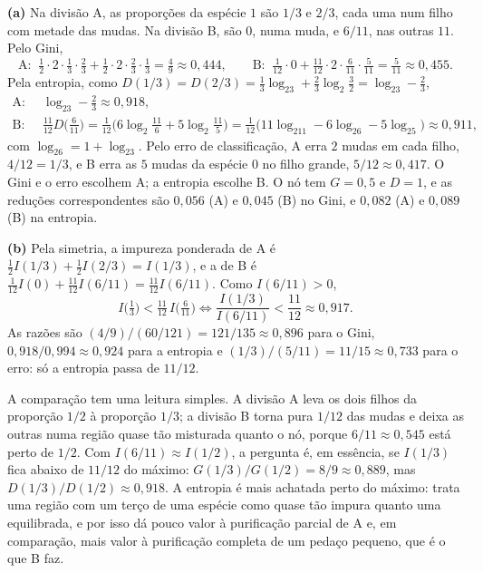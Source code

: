 \begin{solucao}
\textbf{(a)} Na divisão A, as proporções da espécie $1$ são $1/3$ e $2/3$, cada uma num filho
com metade das mudas. Na divisão B, são $0$, numa muda, e $6/11$, nas outras $11$. Pelo Gini,
\[
  \text{A: }\ \tfrac12\cdot2\cdot\tfrac13\cdot\tfrac23+\tfrac12\cdot2\cdot\tfrac23\cdot\tfrac13=\tfrac49\approx0{,}444,
  \qquad
  \text{B: }\ \tfrac1{12}\cdot0+\tfrac{11}{12}\cdot2\cdot\tfrac6{11}\cdot\tfrac5{11}=\tfrac5{11}\approx0{,}455 .
\]
Pela entropia, como $D(1/3)=D(2/3)=\tfrac13\log_23+\tfrac23\log_2\tfrac32=\log_23-\tfrac23$,
\begin{align*}
  \text{A: }\ &\log_23-\tfrac23\approx0{,}918,\\
  \text{B: }\ &\tfrac{11}{12}D\big(\tfrac6{11}\big)
  =\tfrac1{12}\Big(6\log_2\tfrac{11}6+5\log_2\tfrac{11}5\Big)
  =\tfrac1{12}\big(11\log_211-6\log_26-5\log_25\big)\approx0{,}911 ,
\end{align*}
com $\log_26=1+\log_23$. Pelo erro de classificação, A erra $2$ mudas em cada filho, $4/12=1/3$,
e B erra as $5$ mudas da espécie $0$ no filho grande, $5/12\approx0{,}417$. O Gini e o erro
escolhem A; a entropia escolhe B. O nó tem $G=0{,}5$ e $D=1$, e as reduções correspondentes são
$0{,}056$ (A) e $0{,}045$ (B) no Gini, e $0{,}082$ (A) e $0{,}089$ (B) na entropia.

\smallskip
\textbf{(b)} Pela simetria, a impureza ponderada de A é
$\tfrac12I(1/3)+\tfrac12I(2/3)=I(1/3)$, e a de B é
$\tfrac1{12}I(0)+\tfrac{11}{12}I(6/11)=\tfrac{11}{12}I(6/11)$. Como $I(6/11)>0$,
\[
  I\big(\tfrac13\big)<\tfrac{11}{12}\,I\big(\tfrac6{11}\big)
  \iff \frac{I(1/3)}{I(6/11)}<\frac{11}{12}\approx0{,}917 .
\]
As razões são $(4/9)/(60/121)=121/135\approx0{,}896$ para o Gini,
$0{,}918/0{,}994\approx0{,}924$ para a entropia e $(1/3)/(5/11)=11/15\approx0{,}733$ para o erro: só
a entropia passa de $11/12$.

A comparação tem uma leitura simples. A divisão A leva os dois filhos da proporção $1/2$ à
proporção $1/3$; a divisão B torna pura $1/12$ das mudas e deixa as outras numa região quase tão
misturada quanto o nó, porque $6/11\approx0{,}545$ está perto de $1/2$. Com
$I(6/11)\approx I(1/2)$, a pergunta é, em essência, se $I(1/3)$ fica abaixo de $11/12$ do
máximo: $G(1/3)/G(1/2)=8/9\approx0{,}889$, mas $D(1/3)/D(1/2)\approx0{,}918$. A entropia é mais
achatada perto do máximo: trata uma região com um terço de uma espécie como quase tão impura
quanto uma equilibrada, e por isso dá pouco valor à purificação parcial de A e, em comparação,
mais valor à purificação completa de um pedaço pequeno, que é o que B faz.


\end{solucao}
